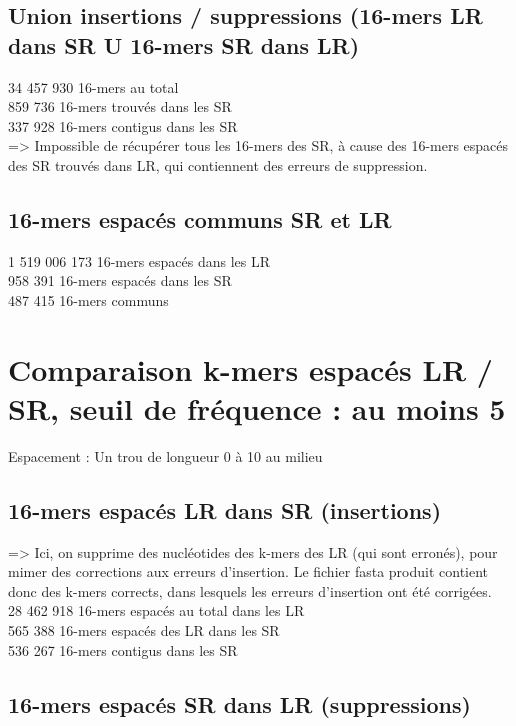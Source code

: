 \documentclass[12pt]{article}
\begin{document}
\subsection{Union insertions / suppressions (16-mers LR dans SR U 16-mers SR dans LR)}

34 457 930 16-mers au total \\
 859 736 16-mers trouvés dans les SR \\
 337 928 16-mers contigus dans les SR \\

=> Impossible de récupérer tous les 16-mers des SR, à cause des 16-mers espacés des SR trouvés dans LR,
qui contiennent des erreurs de suppression.

\subsection{16-mers espacés communs SR et LR}

1 519 006 173 16-mers espacés dans les LR \\
 958 391 16-mers espacés dans les SR \\
 487 415 16-mers communs

\section{Comparaison k-mers espacés LR / SR, seuil de fréquence : au moins 5}

Espacement : Un trou de longueur 0 à 10 au milieu \\

\subsection{16-mers espacés LR dans SR (insertions)}

=> Ici, on supprime des nucléotides des k-mers des LR (qui sont erronés), pour mimer des corrections aux
erreurs d'insertion. Le fichier fasta produit contient donc des k-mers corrects, dans lesquels
les erreurs d'insertion ont été corrigées. \\

28 462 918 16-mers espacés au total dans les LR \\
 565 388 16-mers espacés des LR dans les SR \\
 536 267 16-mers contigus dans les SR

\subsection{16-mers espacés SR dans LR (suppressions)}
\end{document}
